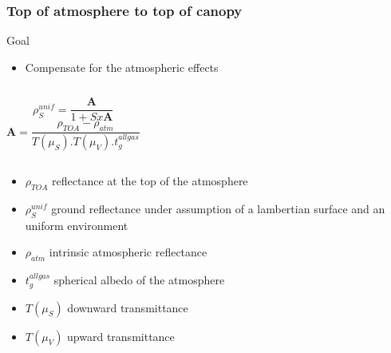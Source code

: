 \documentclass[compress]{beamer}
\begin{document}
\begin{frame}

  \frametitle{Top of atmosphere to top of canopy}

  \begin{block}{Goal}
   \begin{itemize}
    \item Compensate for the atmospheric effects
   \end{itemize}
  \end{block}
 
  
  \begin{columns}
  \footnotesize
  \begin{equation*}
   \rho_{S}^{unif} = \frac{ \mathbf{A} }{ 1 + Sx\mathbf{A} }
  \end{equation*}
  \begin{equation*}
   \mathbf{A} = \frac{ \rho_{TOA} - \rho_{atm} }{ T(\mu_{S}).T(\mu_{V}).t_{g}^{all gas} }
  \end{equation*}
  \end{columns}
  \begin{itemize}
  \item $\rho_{TOA}$ reflectance at the top of the atmosphere
  \item $\rho_{S}^{unif}$ ground reflectance under assumption
  of a lambertian surface and an uniform environment
  \item $\rho_{atm}$ intrinsic atmospheric reflectance
  \item $t_{g}^{all gas}$ spherical albedo of the atmosphere
  \item $T(\mu_{S})$ downward transmittance
  \item $T(\mu_{V})$ upward transmittance
  \end{itemize}
\end{frame}
\end{document}
